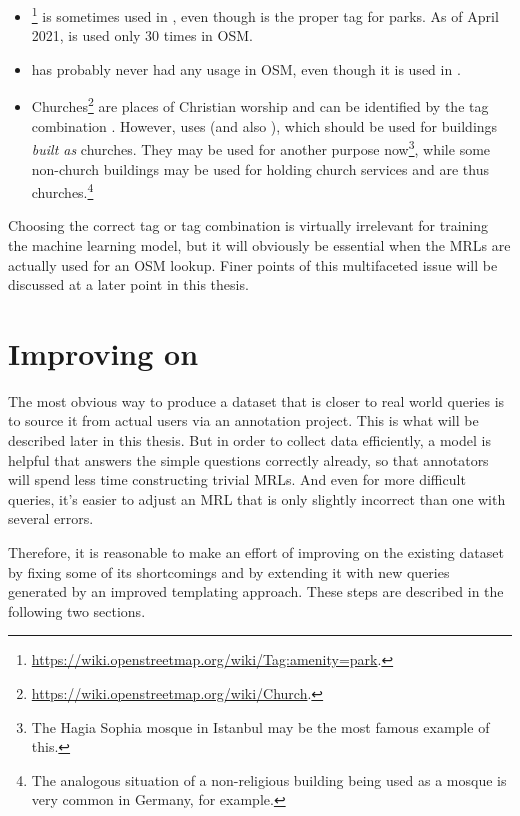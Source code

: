 \begin{itemize}
\item
  \footnote{\url{https://wiki.openstreetmap.org/wiki/Tag:amenity=park}.}
  is sometimes used in \nlmapstwo{}, even though  is the
  proper tag for parks. As of April 2021,  is used only
  \num{30} times in OSM.
\item {} has probably never had any usage in OSM, even though
  it is used in \nlmapstwo{}.
\item Churches\footnote{\url{https://wiki.openstreetmap.org/wiki/Church}.} are
  places of Christian worship and can be identified by the tag combination
  . However, \nlmapstwo{}
  uses  (and also ), which
  should be used for buildings \emph{built as} churches. They may be used for
  another purpose now\footnote{The Hagia Sophia mosque in Istanbul may be the
    most famous example of this.}, while some non-church buildings may be used
  for holding church services and are thus churches.\footnote{The analogous
    situation of a non-religious building being used as a mosque is very common
    in Germany, for example.}
\end{itemize}

Choosing the correct tag or tag combination is virtually irrelevant for training
the machine learning model, but it will obviously be essential when the MRLs are
actually used for an OSM lookup. Finer points of this multifaceted issue will be
discussed at a later point in this thesis.

\section{Improving on \nlmapstwo{}}

The most obvious way to produce a dataset that is closer to real world queries
is to source it from actual users via an annotation project. This is what will
be described later in this thesis. But in order to collect data efficiently, a
model is helpful that answers the simple questions correctly already, so that
annotators will spend less time constructing trivial MRLs. And even for more
difficult queries, it’s easier to adjust an MRL that is only slightly incorrect
than one with several errors.

Therefore, it is reasonable to make an effort of improving on the existing
\nlmapstwo{} dataset by fixing some of its shortcomings and by extending it with
new queries generated by an improved templating approach. These steps are
described in the following two sections.

